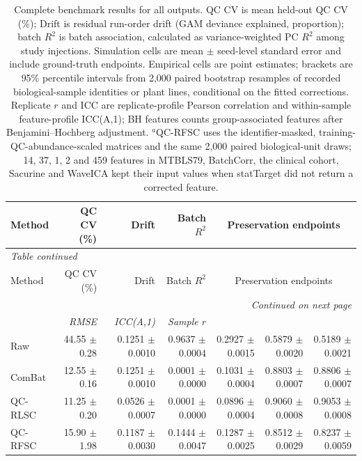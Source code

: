 \begin{landscape}
\scriptsize
\begin{longtable}{lrrrrrr}
\caption{Complete benchmark results for all outputs. QC CV is mean held-out QC CV (\%); Drift is residual run-order drift (GAM deviance explained, proportion); batch $R^2$ is batch association, calculated as variance-weighted PC $R^2$ among study injections. Simulation cells are mean $\pm$ seed-level standard error and include ground-truth endpoints. Empirical cells are point estimates; brackets are 95\% percentile intervals from 2,000 paired bootstrap resamples of recorded biological-sample identities or plant lines, conditional on the fitted corrections. Replicate $r$ and ICC are replicate-profile Pearson correlation and within-sample feature-profile ICC(A,1); BH features counts group-associated features after Benjamini--Hochberg adjustment. $^{a}$QC-RFSC uses the identifier-masked, training-QC-abundance-scaled matrices and the same 2,000 paired biological-unit draws; 14, 37, 1, 2 and 459 features in MTBLS79, BatchCorr, the clinical cohort, Sacurine and WaveICA kept their input values when statTarget did not return a corrected feature.}\label{tab:supp_complete_benchmark}\\
\toprule
Method & QC CV (\%) & Drift & Batch $R^2$ & \multicolumn{3}{c}{Preservation endpoints} \\
\midrule
\endfirsthead
\multicolumn{7}{l}{\textit{Table \thetable{} continued}}\\
\toprule
Method & QC CV (\%) & Drift & Batch $R^2$ & \multicolumn{3}{c}{Preservation endpoints} \\
\midrule
\endhead
\midrule
\multicolumn{7}{r}{\textit{Continued on next page}}\\
\endfoot
\bottomrule
\endlastfoot
\multicolumn{4}{l}{\textbf{Simulation} (mean $\pm$ SE, ten seeds)} & \textit{RMSE} & \textit{ICC(A,1)} & \textit{Sample $r$} \\
\midrule
Raw & 44.55 $\pm$ 0.28 & 0.1251 $\pm$ 0.0010 & 0.9637 $\pm$ 0.0004 & 0.2927 $\pm$ 0.0015 & 0.5879 $\pm$ 0.0020 & 0.5189 $\pm$ 0.0021 \\
ComBat & 12.55 $\pm$ 0.16 & 0.1251 $\pm$ 0.0010 & 0.0001 $\pm$ 0.0000 & 0.1031 $\pm$ 0.0004 & 0.8803 $\pm$ 0.0007 & 0.8806 $\pm$ 0.0007 \\
QC-RLSC & 11.25 $\pm$ 0.20 & 0.0526 $\pm$ 0.0007 & 0.0001 $\pm$ 0.0000 & 0.0896 $\pm$ 0.0004 & 0.9060 $\pm$ 0.0008 & 0.9053 $\pm$ 0.0008 \\
QC-RFSC & 15.90 $\pm$ 1.98 & 0.1187 $\pm$ 0.0030 & 0.1444 $\pm$ 0.0047 & 0.1287 $\pm$ 0.0025 & 0.8512 $\pm$ 0.0029 & 0.8237 $\pm$ 0.0059 \\

\end{longtable}
\end{landscape}
